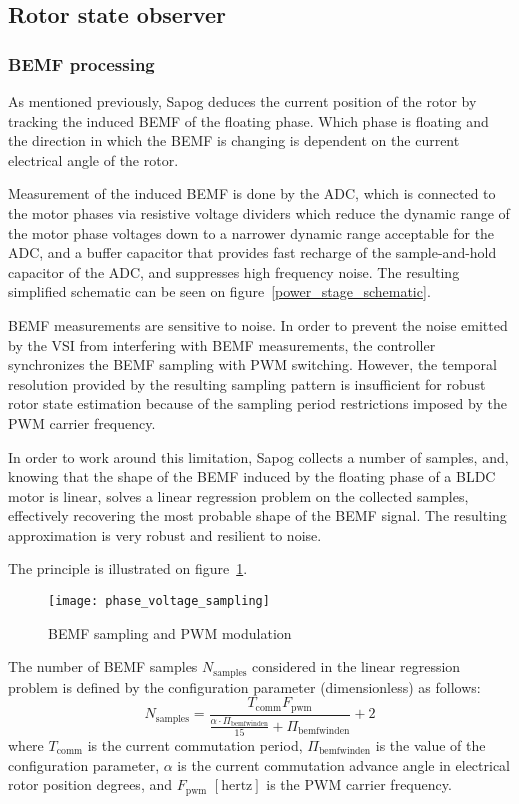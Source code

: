 \documentclass{zubaxdoc}
\begin{document}
\subsection{Rotor state observer}

\subsubsection{BEMF processing}

As mentioned previously, Sapog deduces the current position of the rotor by tracking the induced BEMF
of the floating phase.
Which phase is floating and the direction in which the BEMF is changing is dependent on the current electrical
angle of the rotor.

Measurement of the induced BEMF is done by the ADC, which is connected to the motor phases via
resistive voltage dividers which reduce the dynamic range of the motor phase voltages down to a narrower
dynamic range acceptable for the ADC,
and a buffer capacitor that provides fast recharge of the sample-and-hold capacitor of the ADC,
and suppresses high frequency noise.
The resulting simplified schematic can be seen on figure~\ref{power_stage_schematic}.

BEMF measurements are sensitive to noise.
In order to prevent the noise emitted by the VSI from interfering with BEMF measurements,
the controller synchronizes the BEMF sampling with PWM switching.
However, the temporal resolution provided by the resulting sampling pattern is insufficient for robust
rotor state estimation because of the sampling period restrictions imposed by the
PWM carrier frequency.

In order to work around this limitation, Sapog collects a number of samples, and,
knowing that the shape of the BEMF induced by the floating phase of a BLDC motor is linear,
solves a linear regression problem on the collected samples, effectively recovering the most probable
shape of the BEMF signal.
The resulting approximation is very robust and resilient to noise.

The principle is illustrated on figure~\ref{phase_voltage_sampling}.

\begin{figure}[hbtp]
	\centering
	\texttt{[image: phase\_voltage\_sampling]}
	\caption{BEMF sampling and PWM modulation
		\label{phase_voltage_sampling}}
\end{figure}

The number of BEMF samples $N_\text{samples}$ considered in the linear regression problem is defined by
the configuration parameter  (dimensionless) as follows:
\begin{equation}
	N_\text{samples} =
	\frac{T_{\text{comm}} F_{\text{pwm}}}{\frac{\alpha\cdot{}\Pi_\text{bemfwinden}}{15} + \Pi_\text{bemfwinden}} + 2
\end{equation}
where $T_{\text{comm}}$ is the current commutation period,
$\Pi_\text{bemfwinden}$ is the value of the configuration parameter,
$\alpha$ is the current commutation advance angle in electrical rotor position degrees,
and $F_{\text{pwm}}$ $\left[\text{hertz}\right]$ is the PWM carrier frequency.
\end{document}
